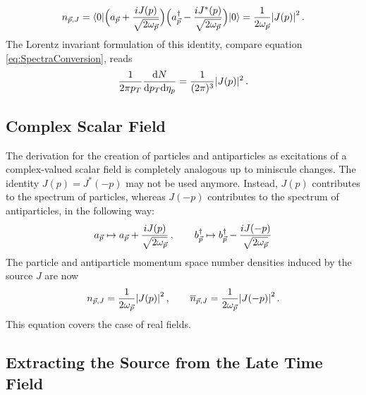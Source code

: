 \begin{equation}
    n_{\vec{p},J}={\langle0\rvert}\Big(a_{\vec{p}}+\frac{{i} J(p)}{\sqrt{2\omega_{\vec{p}}}}\Big)\Big(a_{\vec{p}}^\dagger-\frac{{i} J^*(p)}{\sqrt{2\omega_{\vec{p}}}}\Big){\lvert0\rangle}=\frac{1}{2\omega_{\vec{p}}}{\vert J(p)\vert}^2\,.
    \label{eq:RealField_NumOpExval_Source}
\end{equation}
The Lorentz invariant formulation of this identity, compare equation \eqref{eq:SpectraConversion}, reads
\begin{equation}
    \frac{1}{2\pi p_T}\frac{\text{d} N}{\text{d} p_T\text{d}\eta_p}=\frac{1}{(2\pi)^3}\vert J(p)\vert^2\,.
\end{equation}

\subsection{Complex Scalar Field}

The derivation for the creation of particles and antiparticles as excitations of a complex-valued scalar field is completely analogous up to miniscule changes. The identity ${J(p)=J^*(-p)}$ may not be used anymore. Instead, $J(p)$ contributes to the spectrum of particles, whereas $J(-p)$ contributes to the spectrum of antiparticles, in the following way:
\begin{equation}
    a_{\vec{p}}\mapsto a_{\vec{p}}+\frac{{i} J(p)}{\sqrt{2\omega_{\vec{p}}}}\,,\qquad b_{\vec{p}}^\dagger\mapsto b_{\vec{p}}^\dagger-\frac{{i} J(-p)}{\sqrt{2\omega_{\vec{p}}}}
\end{equation}
The particle and antiparticle momentum space number densities induced by the source $J$ are now
\begin{equation}
    n_{\vec{p},J}=\frac{1}{2\omega_{\vec{p}}}{\vert J(p)\vert}^2\,,\qquad \overline{n}_{\vec{p},J}=\frac{1}{2\omega_{\vec{p}}}{\vert J(-p)\vert}^2\,.
    \label{eq:SpectraFromSource}
\end{equation}
This equation covers the case of real fields.


\subsection{Extracting the Source from the Late Time Field}

